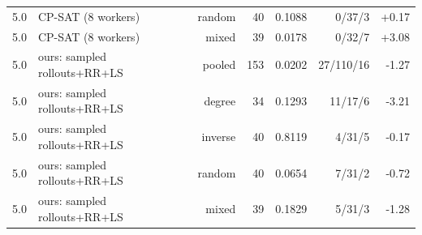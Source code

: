 \begin{table}[t]
\begin{tabular}{llrrrrr}
5.0 & CP-SAT (8 workers) & random & 40 & 0.1088 & 0/37/3 & +0.17 \\
5.0 & CP-SAT (8 workers) & mixed & 39 & 0.0178 & 0/32/7 & +3.08 \\
5.0 & ours: sampled rollouts+RR+LS & pooled & 153 & 0.0202 & 27/110/16 & -1.27 \\
5.0 & ours: sampled rollouts+RR+LS & degree & 34 & 0.1293 & 11/17/6 & -3.21 \\
5.0 & ours: sampled rollouts+RR+LS & inverse & 40 & 0.8119 & 4/31/5 & -0.17 \\
5.0 & ours: sampled rollouts+RR+LS & random & 40 & 0.0654 & 7/31/2 & -0.72 \\
5.0 & ours: sampled rollouts+RR+LS & mixed & 39 & 0.1829 & 5/31/3 & -1.28 \\
\bottomrule
\end{tabular}
\end{table}
